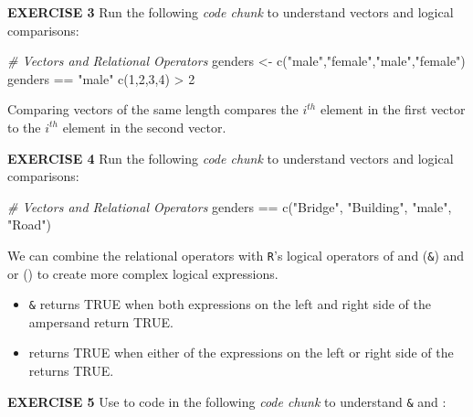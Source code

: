 \documentclass[
]{article}
\newenvironment{Shaded}{\begin{snugshade}}{\end{snugshade}}
\newcommand{\CommentTok}[1]{\textcolor[rgb]{0.56,0.35,0.01}{\textit{#1}}}
\newcommand{\DecValTok}[1]{\textcolor[rgb]{0.00,0.00,0.81}{#1}}
\newcommand{\FunctionTok}[1]{\textcolor[rgb]{0.00,0.00,0.00}{#1}}
\newcommand{\NormalTok}[1]{#1}
\newcommand{\OtherTok}[1]{\textcolor[rgb]{0.56,0.35,0.01}{#1}}
\newcommand{\SpecialCharTok}[1]{\textcolor[rgb]{0.00,0.00,0.00}{#1}}
\newcommand{\StringTok}[1]{\textcolor[rgb]{0.31,0.60,0.02}{#1}}
\providecommand{\tightlist}{%
  \setlength{\itemsep}{0pt}\setlength{\parskip}{0pt}}
\begin{document}
\textbf{EXERCISE 3} Run the following \emph{code chunk} to understand
vectors and logical comparisons:

\begin{Shaded}
\begin{Highlighting}[]
\CommentTok{\# Vectors and Relational Operators}
\NormalTok{genders }\OtherTok{\textless{}{-}} \FunctionTok{c}\NormalTok{(}\StringTok{"male"}\NormalTok{,}\StringTok{"female"}\NormalTok{,}\StringTok{"male"}\NormalTok{,}\StringTok{"female"}\NormalTok{)}
\NormalTok{genders }\SpecialCharTok{==} \StringTok{"male"}
\FunctionTok{c}\NormalTok{(}\DecValTok{1}\NormalTok{,}\DecValTok{2}\NormalTok{,}\DecValTok{3}\NormalTok{,}\DecValTok{4}\NormalTok{) }\SpecialCharTok{\textgreater{}} \DecValTok{2}
\end{Highlighting}
\end{Shaded}

Comparing vectors of the same length compares the \(i^{th}\) element in
the first vector to the \(i^{th}\) element in the second vector.

\textbf{EXERCISE 4} Run the following \emph{code chunk} to understand
vectors and logical comparisons:

\begin{Shaded}
\begin{Highlighting}[]
\CommentTok{\# Vectors and Relational Operators}
\NormalTok{genders }\SpecialCharTok{==} \FunctionTok{c}\NormalTok{(}\StringTok{"Bridge"}\NormalTok{, }\StringTok{"Building"}\NormalTok{, }\StringTok{"male"}\NormalTok{, }\StringTok{"Road"}\NormalTok{)}
\end{Highlighting}
\end{Shaded}

We can combine the relational operators with \texttt{R}'s logical
operators of and (\texttt{\&}) and or (\texttt{\textbar{}}) to create
more complex logical expressions.

\begin{itemize}
\tightlist
\item
  \texttt{\&} returns TRUE when both expressions on the left and right
  side of the ampersand return TRUE.
\item
  \texttt{\textbar{}} returns TRUE when either of the expressions on the
  left or right side of the \texttt{\textbar{}} returns TRUE.
\end{itemize}

\textbf{EXERCISE 5} Use to code in the following \emph{code chunk} to
understand \texttt{\&} and \texttt{\textbar{}}:
\end{document}
